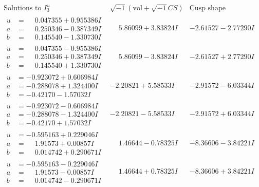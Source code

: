 \documentclass[1p]{elsarticle_modified}
\theoremstyle{definition}
\newcommand{\I}{\sqrt{-1}}
\begin{document}
$$\begin{array}{c|c|c}  
\text{Solutions to }I^u_{3}& \I (\text{vol} + \sqrt{-1}CS) & \text{Cusp shape}\\
 \hline 
\begin{aligned}
u &= \phantom{-}0.047355 + 0.955386 I \\
a &= \phantom{-}0.250346 - 0.387349 I \\
b &= \phantom{-}0.145540 - 1.330730 I\end{aligned}
 & \phantom{-}5.86099 + 3.83824 I & -2.61527 - 2.77290 I \\ \hline\begin{aligned}
u &= \phantom{-}0.047355 - 0.955386 I \\
a &= \phantom{-}0.250346 + 0.387349 I \\
b &= \phantom{-}0.145540 + 1.330730 I\end{aligned}
 & \phantom{-}5.86099 - 3.83824 I & -2.61527 + 2.77290 I \\ \hline\begin{aligned}
u &= -0.923072 + 0.606984 I \\
a &= -0.288078 + 1.324400 I \\
b &= -0.42170 - 1.57032 I\end{aligned}
 & -2.20821 + 5.58533 I & -2.91572 - 6.03344 I \\ \hline\begin{aligned}
u &= -0.923072 - 0.606984 I \\
a &= -0.288078 - 1.324400 I \\
b &= -0.42170 + 1.57032 I\end{aligned}
 & -2.20821 - 5.58533 I & -2.91572 + 6.03344 I \\ \hline\begin{aligned}
u &= -0.595163 + 0.229046 I \\
a &= \phantom{-}1.91573 + 0.00857 I \\
b &= \phantom{-}0.014742 + 0.290671 I\end{aligned}
 & \phantom{-}1.46644 - 0.78325 I & -8.36606 - 3.84221 I \\ \hline\begin{aligned}
u &= -0.595163 - 0.229046 I \\
a &= \phantom{-}1.91573 - 0.00857 I \\
b &= \phantom{-}0.014742 - 0.290671 I\end{aligned}
 & \phantom{-}1.46644 + 0.78325 I & -8.36606 + 3.84221 I \\ \hline\begin{aligned}

\end{aligned}
\end{array}$$
\end{document}
